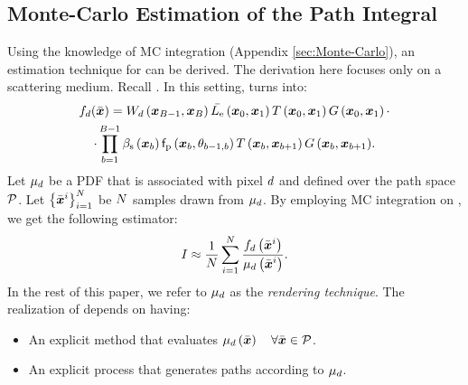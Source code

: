 \documentclass{article}
\begin{document}
\subsection{Monte-Carlo Estimation of the Path Integral}
\label{sec:MC_est_path_integral}
Using the knowledge of \ac{MC} integration (Appendix \ref{sec:Monte-Carlo}), an estimation technique for \eq{\ref{eq:path_integral_formulation}} can be derived. The derivation here focuses only on a scattering medium. Recall \eqs{\ref{eq:general_radiance}-\ref{eq:fs}}. In this setting, \eq{\ref{eq:cont_func}} turns into:
\begin{multline}
\label{eq:cont_func_scattering}
f_{d}(\Bar{\boldsymbol{x}}) =  W_{d}\left({\boldsymbol{x}_{B-1},\boldsymbol{x}_{B}}\right)\Bar{L_{\text{e}}}\left({\boldsymbol{x}_{0},\boldsymbol{x}_{1}}\right)T\left({{\boldsymbol{x}_0},{\boldsymbol{x}_{1}}}\right)G\left({\boldsymbol{x}_0,\boldsymbol{x}_{1}}\right)\cdot \\ \cdot \prod_{b=1}^{B-1}{\beta_{\text{s}}\left({\boldsymbol{x}_{b}}\right)\mathsf{f}_{\text{p}}\left({\boldsymbol{x}_{b},\theta_{b-1,b}}\right) T\left({{\boldsymbol{x}_{b}},{\boldsymbol{x}_{b+1}}}\right)G\left({\boldsymbol{x}_{b},\boldsymbol{x}_{b+1}}\right)}.
\end{multline}
Let $\mu_{d}$ be a \ac{PDF} that is associated with pixel $d$ and defined over the path space $\mathcal{P}$. Let $\left\{ {\Bar{\boldsymbol{x}}^{i}}\right\}_{{i}=1}^{N}$ be $N$ samples drawn from $\mu_{d}$. By employing \ac{MC} integration on \eq{\ref{eq:path_integral_formulation}}, we get the following estimator:
\begin{equation}
\label{eq:forward_estimator}
I\approx\frac{1}{N}\sum_{i=1}^{N}{\frac{f_{d}\left({\Bar{\boldsymbol{x}}^{i}}\right)}{\mu_{d}\left({\Bar{\boldsymbol{x}}^{i}}\right)}}.
\end{equation}
In the rest of this paper, we refer to $\mu_{d}$ as the {\em rendering technique}. The realization of \eq{\ref{eq:forward_estimator}} depends on having:
\begin{itemize}
  \item An explicit method that evaluates $\mu_{d}\left({\Bar{\boldsymbol{x}}}\right) \quad \forall \Bar{\boldsymbol{x}}\in\mathcal{P}$.
  \item An explicit process that generates paths according to $\mu_{d}$.
\end{itemize}
\end{document}
